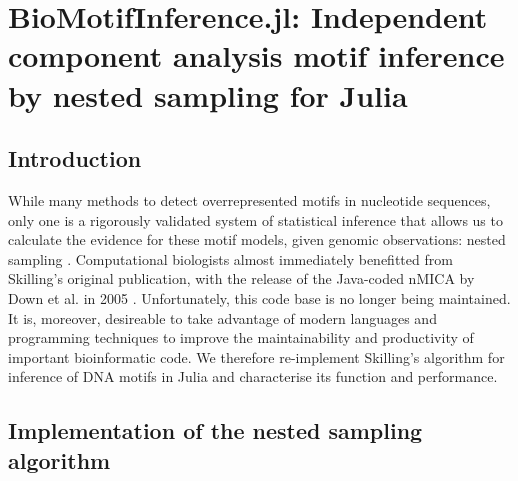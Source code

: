 \chapter{BioMotifInference.jl: Independent component analysis motif inference by nested sampling for Julia}
\label{ch:BMI}
\section{Introduction}
While many methods to detect overrepresented motifs in nucleotide sequences, only one is a rigorously validated system of statistical inference that allows us to calculate the evidence for these motif models, given genomic observations: nested sampling \cite{Skilling2006}. Computational biologists almost immediately benefitted from Skilling's original publication, with the release of the Java-coded nMICA by Down et al. in 2005 \cite{Down2005}. Unfortunately, this code base is no longer being maintained. It is, moreover, desireable to take advantage of modern languages and programming techniques to improve the maintainability and productivity of important bioinformatic code. We therefore re-implement Skilling's algorithm for inference of DNA motifs in Julia \cite{Bezanson2015} and characterise its function and performance.

\section{Implementation of the nested sampling algorithm}


